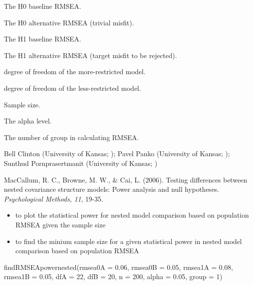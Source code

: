\documentclass[a4paper]{book}
\begin{document}
\begin{Arguments}
\begin{ldescription}
\item[\code{rmsea0A}] The H0 baseline RMSEA.
\item[\code{rmsea0B}] The H0 alternative RMSEA (trivial misfit).
\item[\code{rmsea1A}] The H1 baseline RMSEA.
\item[\code{rmsea1B}] The H1 alternative RMSEA (target misfit to be rejected).
\item[\code{dfA}] degree of freedom of the more-restricted model.
\item[\code{dfB}] degree of freedom of the less-restricted model.
\item[\code{n}] Sample size.
\item[\code{alpha}] The alpha level.
\item[\code{group}] The number of group in calculating RMSEA.
\end{ldescription}
\end{Arguments}
%
\begin{Author}\relax
Bell Clinton (University of Kansas; ); Pavel Panko (University of Kansas; ); Sunthud Pornprasertmanit (University of Kansas; )
\end{Author}
%
\begin{References}\relax
MacCallum, R. C., Browne, M. W., \& Cai, L. (2006). Testing differences between nested covariance structure models: Power analysis and null hypotheses. \emph{Psychological Methods, 11}, 19-35.
\end{References}
%
\begin{SeeAlso}\relax
\begin{itemize}

\item {} to plot the statistical power for nested model comparison based on population RMSEA given the sample size
\item {} to find the minium sample size for a given statistical power in nested model comparison based on population RMSEA

\end{itemize}

\end{SeeAlso}
%
\begin{Examples}
\begin{ExampleCode}
findRMSEApowernested(rmsea0A = 0.06, rmsea0B = 0.05, rmsea1A = 0.08, 
rmsea1B = 0.05, dfA = 22, dfB = 20, n = 200, alpha = 0.05, group = 1)
\end{ExampleCode}
\end{Examples}
\end{document}
